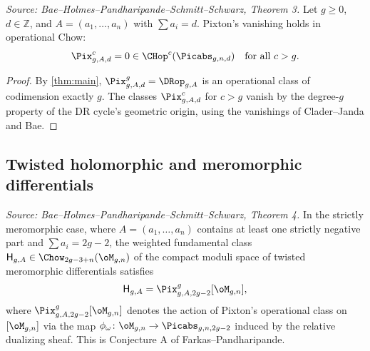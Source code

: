 \begin{theorem}[Vanishing]
  \label{thm:vanishing}
  \textit{Source: Bae--Holmes--Pandharipande--Schmitt--Schwarz, Theorem 3.}
  Let $g \geq 0$, $d \in \mathbb{Z}$, and $A = (a_1,\ldots,a_n)$ with $\sum a_i = d$.
  Pixton's vanishing holds in operational Chow:
  \[
    \Pix^c_{g,A,d} = 0 \in \CHop^c(\Picabs_{g,n,d}) \quad \text{for all } c > g.
  \]
\end{theorem}

\begin{proof}
  By \cref{thm:main}, $\Pix^g_{g,A,d} = \DRop_{g,A}$ is an operational class of
  codimension exactly $g$.  The classes $\Pix^c_{g,A,d}$ for $c > g$ vanish by the
  degree-$g$ property of the DR cycle's geometric origin, using the vanishings of
  Clader--Janda and Bae.
\end{proof}

\subsection{Twisted holomorphic and meromorphic differentials}

\begin{theorem}
  \label{thm:twisted_differentials}
  \textit{Source: Bae--Holmes--Pandharipande--Schmitt--Schwarz, Theorem 4.}
  In the strictly meromorphic case, where $A = (a_1,\ldots,a_n)$ contains at least one
  strictly negative part and $\sum a_i = 2g-2$, the weighted fundamental class
  $\mathsf{H}_{g,A} \in \Chow_{2g-3+n}(\oM_{g,n})$ of the compact moduli space of
  twisted meromorphic differentials satisfies
  \[
    \mathsf{H}_{g,A} = \Pix^g_{g,A,2g-2}[\oM_{g,n}],
  \]
  where $\Pix^g_{g,A,2g-2}[\oM_{g,n}]$ denotes the action of Pixton's operational
  class on $[\oM_{g,n}]$ via the map $\phi_\omega\colon \oM_{g,n} \to \Picabs_{g,n,2g-2}$
  induced by the relative dualizing sheaf.
  This is Conjecture A of Farkas--Pandharipande.
\end{theorem}

